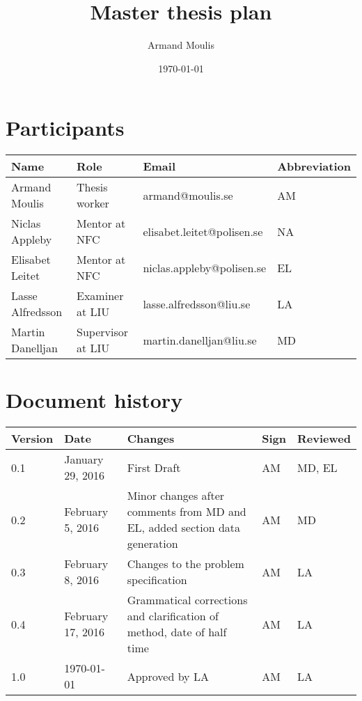 \documentclass{article}
\begin{document}
	



\title{Master thesis plan}
\author{Armand Moulis}
\date{\today}
\maketitle
\newpage

\section*{Participants}

\begin{center}

	\begin{tabular}{|l|l|l|l|}
		\hline
		Name             & Role            & Email                      & Abbreviation \\ \hline
		Armand Moulis    & Thesis worker   & armand@moulis.se           & AM           \\ \hline
		Niclas Appleby   & Mentor at NFC   & elisabet.leitet@polisen.se & NA           \\ \hline
		Elisabet Leitet  & Mentor at NFC   & niclas.appleby@polisen.se  & EL           \\ \hline
		Lasse Alfredsson & Examiner at LIU & lasse.alfredsson@liu.se    & LA           \\ \hline
		Martin Danelljan & Supervisor at LIU   & martin.danelljan@liu.se    & MD           \\ \hline
	\end{tabular}
\end{center}
\newpage


\newpage
\setcounter{tocdepth}{3}
\tableofcontents
\newpage

\section*{Document history}
\begin{center}
	\begin{tabular}{|l|l| p{5cm} |l|l| }
		\hline
		Version &  Date  & Changes     & Sign & Reviewed \\ \hline
		  0.1   & January 29, 2016 & First Draft & AM  & MD, EL \\ \hline
		  0.2   & February 5, 2016 & Minor changes after comments from MD and EL, added section data generation & AM  & MD  \\ \hline
		  0.3   & February 8, 2016 & Changes to the problem specification  & AM  & LA  \\ \hline
		  0.4   & February 17, 2016 & Grammatical corrections and clarification of method, date of half time & AM  &  LA\\ \hline
		  1.0   & \today & Approved by LA & AM  &  LA\\ \hline
	\end{tabular}
\end{center}
\newpage
\end{document}
